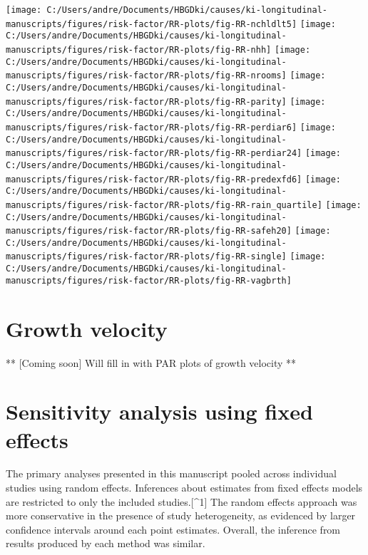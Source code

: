 \documentclass[
  9pt,
]{book}
\begin{document}
\texttt{[image: C:/Users/andre/Documents/HBGDki/causes/ki-longitudinal-manuscripts/figures/risk-factor/RR-plots/fig-RR-nchldlt5]}
\texttt{[image: C:/Users/andre/Documents/HBGDki/causes/ki-longitudinal-manuscripts/figures/risk-factor/RR-plots/fig-RR-nhh]}
\texttt{[image: C:/Users/andre/Documents/HBGDki/causes/ki-longitudinal-manuscripts/figures/risk-factor/RR-plots/fig-RR-nrooms]}
\texttt{[image: C:/Users/andre/Documents/HBGDki/causes/ki-longitudinal-manuscripts/figures/risk-factor/RR-plots/fig-RR-parity]}
\texttt{[image: C:/Users/andre/Documents/HBGDki/causes/ki-longitudinal-manuscripts/figures/risk-factor/RR-plots/fig-RR-perdiar6]}
\texttt{[image: C:/Users/andre/Documents/HBGDki/causes/ki-longitudinal-manuscripts/figures/risk-factor/RR-plots/fig-RR-perdiar24]}
\texttt{[image: C:/Users/andre/Documents/HBGDki/causes/ki-longitudinal-manuscripts/figures/risk-factor/RR-plots/fig-RR-predexfd6]}
\texttt{[image: C:/Users/andre/Documents/HBGDki/causes/ki-longitudinal-manuscripts/figures/risk-factor/RR-plots/fig-RR-rain\_quartile]}
\texttt{[image: C:/Users/andre/Documents/HBGDki/causes/ki-longitudinal-manuscripts/figures/risk-factor/RR-plots/fig-RR-safeh20]}
\texttt{[image: C:/Users/andre/Documents/HBGDki/causes/ki-longitudinal-manuscripts/figures/risk-factor/RR-plots/fig-RR-single]}
\texttt{[image: C:/Users/andre/Documents/HBGDki/causes/ki-longitudinal-manuscripts/figures/risk-factor/RR-plots/fig-RR-vagbrth]}

\hypertarget{velocity}{%
\chapter{Growth velocity}\label{velocity}}

\raggedright

** {[}Coming soon{]} Will fill in with PAR plots of growth velocity **

\hypertarget{fixed-effects}{%
\chapter{Sensitivity analysis using fixed effects}\label{fixed-effects}}

\raggedright

The primary analyses presented in this manuscript pooled across individual studies using random effects. Inferences about estimates from fixed effects models are restricted to only the included studies.{[}\^{}1{]} The random effects approach was more conservative in the presence of study heterogeneity, as evidenced by larger confidence intervals around each point estimates. Overall, the inference from results produced by each method was similar.
\end{document}
